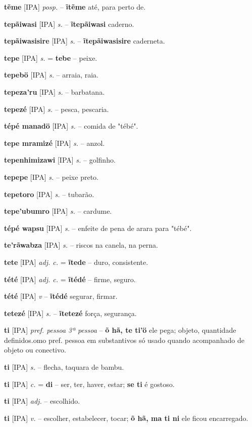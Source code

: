 \textbf{tẽme} [IPA] \textit{posp.} -- \textbf{ĩtẽme} até, para perto de.

\textbf{tepãiwasi} [IPA] \textit{s.} -- \textbf{ĩtepãiwasi} caderno.

\textbf{tepãiwasisire} [IPA] \textit{s.} -- \textbf{ĩtepãiwasisire} caderneta.

\textbf{tepe} [IPA] \textit{s.} = \textbf{tebe} -- peixe.

\textbf{tepebö} [IPA] \textit{s.} -- arraia, raia.

\textbf{tepeza'ru} [IPA] \textit{s.} -- barbatana.

\textbf{tepezé} [IPA] \textit{s.} -- pesca, pescaria.

\textbf{tépé manadö} [IPA] \textit{s.} -- comida de "tébé".

\textbf{tepe mramizé} [IPA] \textit{s.} -- anzol.

\textbf{tepenhimizawi} [IPA] \textit{s.} -- golfinho.

\textbf{tepepe} [IPA] \textit{s.} -- peixe preto.

\textbf{tepetoro} [IPA] \textit{s.} -- tubarão.

\textbf{tepe'ubumro} [IPA] \textit{s.} -- cardume.

\textbf{tépé wapsu} [IPA] \textit{s.} -- enfeite de pena de arara para "tébé".

\textbf{te'rãwabza} [IPA] \textit{s.} -- riscos na canela, na perna.

\textbf{tete} [IPA] \textit{adj. c.} = \textbf{ĩtede} -- duro, consistente.

\textbf{tété} [IPA] \textit{adj. c.} = \textbf{ĩtédé} -- firme, seguro.

\textbf{tété} [IPA] \textit{v} -- \textbf{ĩtédé} segurar, firmar.

\textbf{tetezé} [IPA] \textit{s.} -- \textbf{ĩtetezé} força, segurança.

\textbf{ti} [IPA] \textit{pref. pessoa 3ª pessoa} -- \textbf{õ hã, te ti'ö} ele pega; objeto, quantidade definidos.omo pref. pessoa em substantivos só usado quando acompanhado de objeto ou conectivo.

\textbf{ti} [IPA] \textit{s.} -- flecha, taquara de bambu.

\textbf{ti} [IPA] \textit{c.} = \textbf{di} -- ser, ter, haver, estar; \textbf{se ti} é gostoso.

\textbf{ti} [IPA] \textit{adj.} -- escolhido.

\textbf{ti} [IPA] \textit{v.} -- escolher, estabelecer, tocar; \textbf{õ hã, ma ti ni} ele ficou encarregado.


